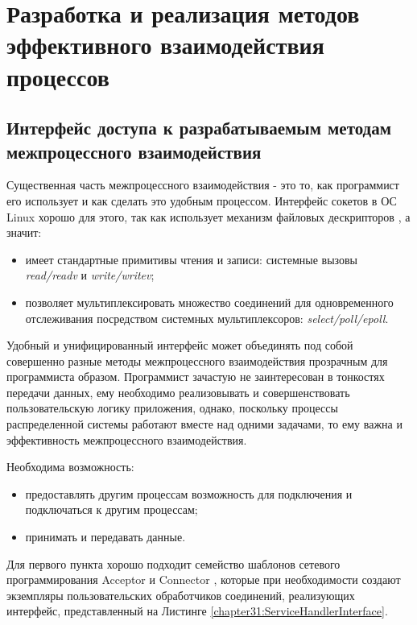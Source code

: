 \chapter{Разработка и реализация методов эффективного взаимодействия процессов}

\section{Интерфейс доступа к разрабатываемым методам межпроцессного взаимодействия}


Существенная часть межпроцессного взаимодействия - это то, как программист его использует и как сделать это удобным процессом. Интерфейс сокетов в ОС Linux хорошо для этого, так как использует механизм файловых дескрипторов
, а значит:
\begin{itemize}
\item имеет стандартные примитивы чтения и записи: системные вызовы \textit{read/readv} и \textit{write/writev};
\item позволяет мультиплексировать множество соединений для одновременного отслеживания посредством системных мультиплексоров: \textit{select/poll/epoll}.
\end{itemize}

Удобный и унифицированный интерфейс может объединять под собой совершенно разные методы межпроцессного взаимодействия прозрачным для программиста образом. Программист зачастую не заинтересован в тонкостях передачи данных, ему необходимо реализовывать и совершенствовать пользовательскую логику приложения, однако, поскольку процессы распределенной системы работают вместе над одними задачами, то ему важна и эффективность межпроцессного взаимодействия.

Необходима возможность:
\begin{itemize}
\item предоставлять другим процессам возможность для подключения и подключаться к другим процессам;
\item принимать и передавать данные.
\end{itemize}

Для первого пункта хорошо подходит семейство шаблонов сетевого программирования Acceptor и Connector \cite{schmidt1996acceptor}, которые при необходимости создают экземпляры пользовательских обработчиков соединений, реализующих интерфейс, представленный на Листинге \ref{chapter31:ServiceHandlerInterface}.

